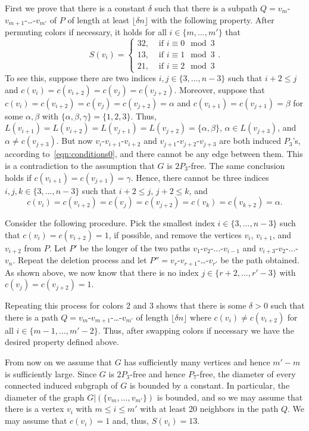 \documentclass[11pt]{article}
\begin{document}
First we prove that there is a constant $\delta$ such that there is a subpath $Q=v_{m}$-$v_{m+1}$-\ldots-$v_{m'}$ of $P$ of length at least $\lfloor \delta n \rfloor$ with the following property.
After permuting colors if necessary, it holds for all $i \in \{m,\ldots,m'\}$ that
\begin{equation*} 
S(v_i)=
\begin{cases}
32, & \mbox{ if } i \equiv 0 \mod 3\\
13, & \mbox{ if } i \equiv 1 \mod 3\\
21, & \mbox{ if } i \equiv 2 \mod 3
\end{cases}.
\end{equation*}
To see this, suppose there are two indices $i,j \in \{3,\ldots,n-3\}$ such that $i+2 \le j$ and $c(v_i)=c(v_{i+2})=c(v_j)=c(v_{j+2})$.
Moreover, suppose that $c(v_i)=c(v_{i+2})=c(v_j)=c(v_{j+2})=\alpha$ and $c(v_{i+1})=c(v_{j+1})=\beta$ for some $\alpha,\beta$ with $\{\alpha,\beta,\gamma\}=\{1,2,3\}$.
Thus, $L(v_{i+1})=L(v_{i+2})=L(v_{j+1})=L(v_{j+2})=\{\alpha,\beta\}$, $\alpha \in L(v_{j+3})$, and $\alpha \neq c(v_{j+3})$.
But now $v_{i}$-$v_{i+1}$-$v_{i+2}$ and $v_{j+1}$-$v_{j+2}$-$v_{j+3}$ are both induced $P_3$'s, according to~\eqref{eqn:conditions0}, and there cannot be any edge between them.
This is a contradiction to the assumption that $G$ is $2P_3$-free.
The same conclusion holds if $c(v_{i+1})=c(v_{j+1})=\gamma$.
Hence, there cannot be three indices $i,j,k \in \{3,\ldots,n-3\}$ such that $i+2 \le j$, $j+2 \le k$, and $$c(v_i)=c(v_{i+2})=c(v_j)=c(v_{j+2})=c(v_k)=c(v_{k+2})=\alpha.$$

Consider the following procedure.
Pick the smallest index $i \in \{3,\ldots,n-3\}$ such that $c(v_i)=c(v_{i+2})=1$, if possible, and remove the vertices $v_{i}$, $v_{i+1}$, and $v_{i+2}$ from $P$.
Let $P'$ be the longer of the two paths $v_1$-$v_2$-$\ldots $-$v_{i-1}$ and $v_{i+3}$-$v_2$-$\ldots $-$v_{n}$.
Repeat the deletion process and let $P'' = v_r$-$v_{r+1}$-\ldots-$v_{r'}$ be the path obtained.
As shown above, we now know that there is no index $j \in \{r+2,\ldots,r'-3\}$ with $c(v_j)=c(v_{j+2})=1$.

Repeating this process for colors 2 and 3 shows that there is some $\delta >0$ such that there is a path $Q=v_{m}$-$v_{m+1}$-\ldots-$v_{m'}$ of length $\lfloor \delta n \rfloor$ where $c(v_i)\neq c(v_{i+2})$ for all $i \in \{m-1,\ldots,m'-2\}$.
Thus, after swapping colors if necessary we have the desired property defined above.

From now on we assume that $G$ has sufficiently many vertices and hence $m'-m$ is sufficiently large.
Since $G$ is $2P_3$-free and hence $P_7$-free, the diameter of every connected induced subgraph of $G$ is bounded by a constant.
In particular, the diameter of the graph $G|(\{v_{m},\ldots,v_{m'}\})$ is bounded, and so we may assume that there is a vertex $v_i$ with $m \le i \le m'$ with at least 20 neighbors in the path $Q$.
We may assume that $c(v_i)=1$ and, thus, $S(v_i)=13$.
\end{document}
